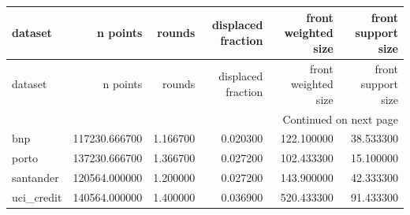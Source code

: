 \begin{center}\label{tab:s8ref}\end{center}
\begingroup\scriptsize\setlength{\tabcolsep}{2.5pt}
\begin{longtable}{lrrrrr}
\toprule
dataset & n points & rounds & displaced fraction & front weighted size & front support size \\
\midrule
\endfirsthead
\toprule
dataset & n points & rounds & displaced fraction & front weighted size & front support size \\
\midrule
\endhead
\midrule
\multicolumn{6}{r}{Continued on next page} \\
\midrule
\endfoot
\bottomrule
\endlastfoot
bnp & 117230.666700 & 1.166700 & 0.020300 & 122.100000 & 38.533300 \\
porto & 137230.666700 & 1.366700 & 0.027200 & 102.433300 & 15.100000 \\
santander & 120564.000000 & 1.200000 & 0.027200 & 143.900000 & 42.333300 \\
uci\_credit & 140564.000000 & 1.400000 & 0.036900 & 520.433300 & 91.433300 \\
\end{longtable}\endgroup\addtocounter{table}{-1}
